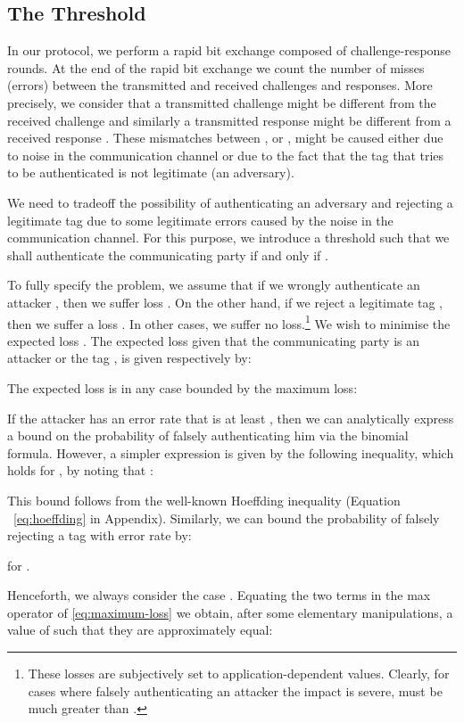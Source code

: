 \documentclass{article}
\begin{document}
\subsection{The Threshold}
In our protocol, we perform a rapid bit exchange composed of 
challenge-response rounds.  At the end of the rapid bit exchange we
count the number of misses (errors)  between the transmitted and
received challenges and responses.  More precisely, we consider that a
transmitted challenge  might be different from the received
challenge  and similarly a transmitted response  might
be different from a received response . These mismatches
between ,  or ,  might be caused either
due to noise in the communication channel or due to the fact that the
tag that tries to be authenticated is not legitimate (an
adversary).

We need to tradeoff the possibility of authenticating an adversary and
rejecting a legitimate tag due to some legitimate errors caused by the
noise in the communication channel.
For this purpose, we introduce a threshold  such that we shall
authenticate the communicating party if and only if .

To fully specify the problem, we assume that if we wrongly
authenticate an attacker , then we suffer loss . On
the other hand, if we reject a legitimate tag , then we suffer a
loss . In other cases, we suffer no loss.\footnote{These
  losses are subjectively set to application-dependent
  values. Clearly, for cases where falsely authenticating an attacker
  the impact is severe,  must be much greater than .} We
wish to minimise the expected loss . The expected loss given
that the communicating party is an attacker  or the tag , is
given respectively by:


The expected loss is in any case bounded by the maximum loss:

If the attacker  has an error rate that is at least , then we can
analytically express a bound on the probability of falsely
authenticating him via the binomial formula. However, a simpler
expression is given by the following inequality, which holds for , by noting that :

This bound follows from the well-known Hoeffding inequality (Equation
~\eqref{eq:hoeffding} in Appendix).  Similarly, we can bound the probability of
falsely rejecting a tag  with error rate  by:

for .

Henceforth, we always consider the case .
Equating the two terms in the max operator of \eqref{eq:maximum-loss}
we obtain, after some elementary manipulations, a value of  such
that they are approximately equal:
\end{document}
